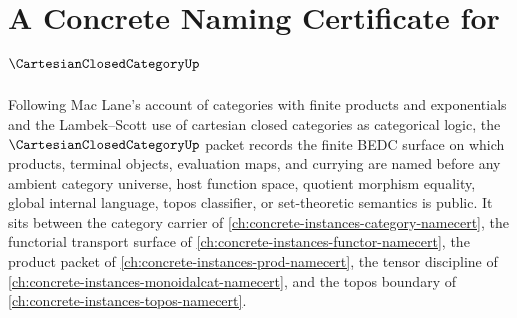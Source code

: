 \chapter{A Concrete Naming Certificate for $\CartesianClosedCategoryUp$}
\label{ch:concrete-instances-cartesian-closed-category-namecert}

Following Mac Lane's account of categories with finite products and exponentials and the Lambek--Scott use of cartesian closed categories as categorical logic, the $\CartesianClosedCategoryUp$ packet records the finite BEDC surface on which products, terminal objects, evaluation maps, and currying are named before any ambient category universe, host function space, quotient morphism equality, global internal language, topos classifier, or set-theoretic semantics is public. It sits between the category carrier of \autoref{ch:concrete-instances-category-namecert}, the functorial transport surface of \autoref{ch:concrete-instances-functor-namecert}, the product packet of \autoref{ch:concrete-instances-prod-namecert}, the tensor discipline of \autoref{ch:concrete-instances-monoidalcat-namecert}, and the topos boundary of \autoref{ch:concrete-instances-topos-namecert}.

